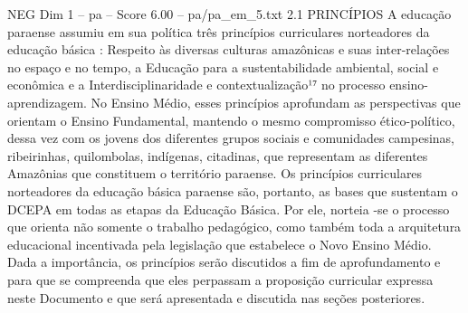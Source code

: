 \begin{textsample}{NEG Dim 1 – pa – Score 6.00 – pa/pa\_em\_5.txt}  \label{ex:f1_neg_256}
2.1 PRINCÍPIOS A educação paraense assumiu em sua política três princípios curriculares norteadores da educação básica : Respeito às diversas culturas amazônicas e suas inter-relações no espaço e no tempo, a Educação para a sustentabilidade ambiental, social e econômica e a Interdisciplinaridade e contextualização¹⁷ no processo ensino-aprendizagem.
No Ensino Médio, esses princípios aprofundam as perspectivas que orientam o Ensino Fundamental, mantendo o mesmo compromisso ético-político, dessa vez com os jovens dos diferentes grupos sociais e comunidades campesinas, ribeirinhas, quilombolas, indígenas, citadinas, que representam as diferentes Amazônias que constituem o território paraense.
Os princípios curriculares norteadores da educação básica paraense são, portanto, as bases que sustentam o DCEPA em todas as etapas da Educação Básica.
Por ele, norteia -se o processo que orienta não somente o trabalho pedagógico, como também toda a arquitetura educacional incentivada pela legislação que estabelece o Novo Ensino Médio.
Dada a importância, os princípios serão discutidos a fim de aprofundamento e para que se compreenda que eles perpassam a proposição curricular expressa neste Documento e que será apresentada e discutida nas seções posteriores.

\end{textsample}
